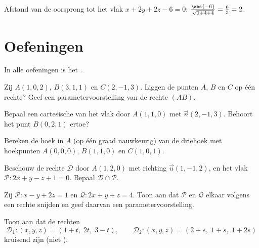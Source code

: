 \begin{example}\label{ex:g12:space:distance}
Afstand van de oorsprong tot het vlak $x + 2y + 2z - 6 = 0$:
$\frac{\abs{-6}}{\sqrt{1 + 4 + 4}} = \frac63 = 2$.
\end{example}

\section{Oefeningen}

In alle oefeningen is het  .

\begin{exercise}[$\star$]\label{exo:g12:space:1}
Zij $A(1, 0, 2)$, $B(3, 1, 1)$ en $C(2, -1, 3)$. Liggen de punten $A$, $B$ en
$C$ op één rechte? Geef een parametervoorstelling van de rechte $(AB)$.
\end{exercise}

\begin{exercise}[$\star$]\label{exo:g12:space:2}
Bepaal een cartesische  van het vlak door $A(1, 1, 0)$ met
 $\vec n(2, -1, 3)$. Behoort het punt $B(0, 2, 1)$ ertoe?
\end{exercise}

\begin{exercise}[$\star$]\label{exo:g12:space:3}
Bereken de hoek in $A$ (op één graad nauwkeurig) van de driehoek met
hoekpunten $A(0,0,0)$, $B(1, 1, 0)$ en $C(1, 0, 1)$.
\end{exercise}

\begin{exercise}[$\star\star$]\label{exo:g12:space:4}
Beschouw de rechte $\mathcal D$ door $A(1, 2, 0)$ met richting
$\vec u(1, -1, 2)$, en het vlak $\mathcal P : 2x + y - z + 1 = 0$. Bepaal
$\mathcal D \cap \mathcal P$.
\end{exercise}

\begin{exercise}[$\star\star$]\label{exo:g12:space:5}
Zij $\mathcal P : x - y + 2z = 1$ en $\mathcal Q : 2x + y + z = 4$. Toon aan
dat $\mathcal P$ en $\mathcal Q$ elkaar volgens een rechte snijden en geef
daarvan een parametervoorstelling.
\end{exercise}

\begin{exercise}[$\star\star$]\label{exo:g12:space:6}
Toon aan dat de rechten
\[
\mathcal D_1 : (x, y, z) = (1 + t,\; 2t,\; 3 - t), \qquad
\mathcal D_2 : (x, y, z) = (2 + s,\; 1 + s,\; 1 + 2s)
\]
kruisend zijn (niet ).
\end{exercise}

